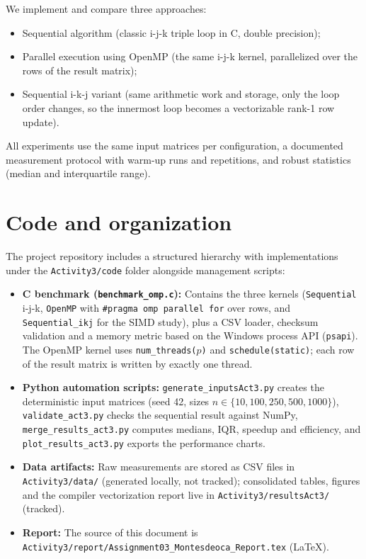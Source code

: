 \documentclass[12pt,a4paper]{article}
\begin{document}
We implement and compare three approaches:
\begin{itemize}
\item Sequential algorithm (classic i-j-k triple loop in C, double
precision);
\item Parallel execution using OpenMP (the same i-j-k kernel, parallelized
over the rows of the result matrix);
\item Sequential i-k-j variant (same arithmetic work and storage, only the
loop order changes, so the innermost loop becomes a vectorizable rank-1
row update).
\end{itemize}

All experiments use the same input matrices per configuration, a documented
measurement protocol with warm-up runs and repetitions, and robust
statistics (median and interquartile range).

\section{Code and organization}
\label{sec:code}

The project repository includes a structured hierarchy with implementations
under the \texttt{Activity3/code} folder alongside management scripts:
\begin{itemize}
\item \textbf{C benchmark (\texttt{benchmark\_omp.c}):} Contains the three
kernels (\texttt{Sequential} i-j-k, \texttt{OpenMP} with
\texttt{\#pragma omp parallel for} over rows, and \texttt{Sequential\_ikj}
for the SIMD study), plus a CSV loader, checksum validation and a memory
metric based on the Windows process API (\texttt{psapi}). The OpenMP kernel
uses \texttt{num\_threads($p$)} and \texttt{schedule(static)}; each row of
the result matrix is written by exactly one thread.
\item \textbf{Python automation scripts:} \texttt{generate\_inputsAct3.py}
creates the deterministic input matrices (seed 42, sizes
$n \in \{10, 100, 250, 500, 1000\}$), \texttt{validate\_act3.py} checks the
sequential result against NumPy, \texttt{merge\_results\_act3.py} computes
medians, IQR, speedup and efficiency, and \texttt{plot\_results\_act3.py}
exports the performance charts.
\item \textbf{Data artifacts:} Raw measurements are stored as CSV files in
\texttt{Activity3/data/} (generated locally, not tracked); consolidated
tables, figures and the compiler vectorization report live in
\texttt{Activity3/resultsAct3/} (tracked).
\item \textbf{Report:} The source of this document is
\texttt{Activity3/report/Assignment03\_Montesdeoca\_Report.tex} (LaTeX).
\end{itemize}
\end{document}
